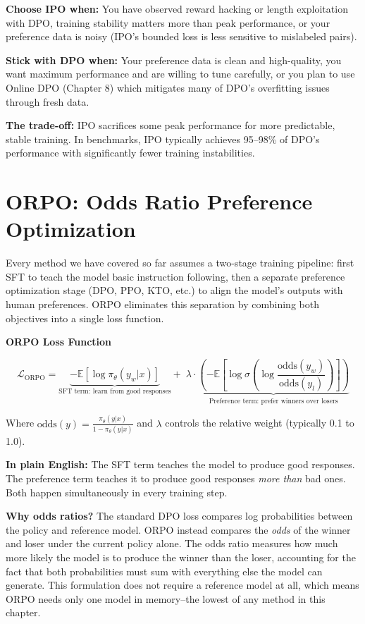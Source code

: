 \begin{chapterenv}
\begin{tipbox}
\textbf{Choose IPO when:} You have observed reward hacking or length exploitation with DPO, training stability matters more than peak performance, or your preference data is noisy (IPO's bounded loss is less sensitive to mislabeled pairs).

\textbf{Stick with DPO when:} Your preference data is clean and high-quality, you want maximum performance and are willing to tune carefully, or you plan to use Online DPO (Chapter 8) which mitigates many of DPO's overfitting issues through fresh data.

\textbf{The trade-off:} IPO sacrifices some peak performance for more predictable, stable training. In benchmarks, IPO typically achieves 95--98\% of DPO's performance with significantly fewer training instabilities.
\end{tipbox}

\section{ORPO: Odds Ratio Preference Optimization}

Every method we have covered so far assumes a two-stage training pipeline: first SFT to teach the model basic instruction following, then a separate preference optimization stage (DPO, PPO, KTO, etc.) to align the model's outputs with human preferences. ORPO eliminates this separation by combining both objectives into a single loss function.

\begin{infobox}
\textbf{ORPO Loss Function}

$$\mathcal{L}_{\text{ORPO}} = \underbrace{-\mathbb{E}\!\left[\log \pi_\theta(y_w|x)\right]}_{\text{SFT term: learn from good responses}} + \;\lambda \cdot \underbrace{\left(-\mathbb{E}\!\left[\log \sigma\!\left(\log \frac{\text{odds}(y_w)}{\text{odds}(y_l)}\right)\right]\right)}_{\text{Preference term: prefer winners over losers}}$$

Where $\text{odds}(y) = \frac{\pi_\theta(y|x)}{1 - \pi_\theta(y|x)}$ and $\lambda$ controls the relative weight (typically 0.1 to 1.0).

\textbf{In plain English:} The SFT term teaches the model to produce good responses. The preference term teaches it to produce good responses \textit{more than} bad ones. Both happen simultaneously in every training step.
\end{infobox}

\textbf{Why odds ratios?} The standard DPO loss compares log probabilities between the policy and reference model. ORPO instead compares the \textit{odds} of the winner and loser under the current policy alone. The odds ratio measures how much more likely the model is to produce the winner than the loser, accounting for the fact that both probabilities must sum with everything else the model can generate. This formulation does not require a reference model at all, which means ORPO needs only one model in memory--the lowest of any method in this chapter.


\end{chapterenv}
